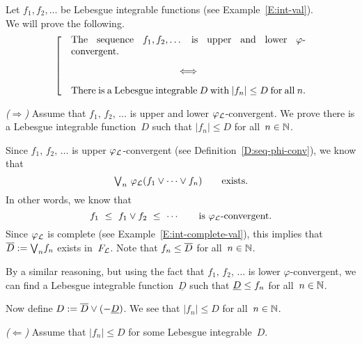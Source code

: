 \documentclass[main.tex]{subfiles}
\begin{document}
%
%
\begin{ex}
\label{E:seq-phi-conv}
Let $f_1,f_2,\dotsc$ be  Lebesgue integrable functions
(see Example~\ref{E:int-val}). \\
We will prove the following.
\begin{equation}
\label{eq:E:seq-phi-conv}
\left[\quad
\begin{minipage}{.7\columnwidth}
 The sequence $f_1,f_2,\dotsc$
is  upper and lower $\varphi$-convergent.
\begin{center}
$\Longleftrightarrow$
\end{center}
There is a Lebesgue integrable~$D$ with $|f_n| \leq D$ for all~$n$.
\end{minipage}
\right.
\end{equation}

\vspace{.3em}
\emph{($\Longrightarrow$)}
Assume that  $f_1,\,f_2,\,\dotsc$ is upper and lower $\varphi_{\mathcal{L}}$-convergent.
We prove there is a Lebesgue integrable function~$D$ such that
$|f_n|\leq D$ for all~$n\in \mathbb{N}$.

Since $f_1,\,f_2,\,\dotsc$ is  upper $\varphi_{\mathcal{L}}$-convergent
(see Definition~\ref{D:seq-phi-conv}), 
we know that 
\begin{equation*}
\textstyle{\bigvee}_n \ \varphi_{\mathcal{L}}(f_1 \vee \dotsb \vee f_n)\qquad\text{exists.}
\end{equation*}
In other words, we know that
\begin{equation*}
f_1 \ \leq\ f_1 \vee f_2 \ \leq\ \dotsb \qquad\text{is $\varphi_{\mathcal{L}}$-convergent.}
\end{equation*}
Since $\varphi_{\mathcal{L}}$ is complete
(see Example~\ref{E:int-complete-val}),
this implies that $\overline{D}:= \textstyle{\bigvee}_n f_n$ exists in~$F_{\mathcal{L}}$.
Note that $f_n \leq \overline{D}$ for all~$n\in \mathbb{N}$.

By a similar reasoning, but using the fact that
$f_1,\,f_2,\,\dotsc$ is lower $\varphi$-convergent,
we can find a Lebesgue integrable function~$\underline{D}$
such that $\underline{D}\leq f_n$ for all~$n\in \mathbb{N}$.

Now define $D:=  \overline{D} \vee (-\underline{D})$. We see that $|f_n|\leq D$
for all~$n\in \mathbb{N}$.

\vspace{.3em}

\emph{($\Longleftarrow$)}
Assume
 that $|f_n|\leq D$
for some Lebesgue integrable~$D$.


\end{ex}
\end{document}
